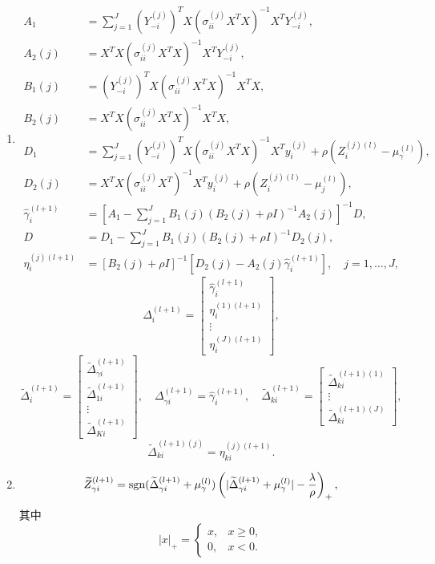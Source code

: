 \begin{enumerate}[label=步骤 \arabic*：,leftmargin=4.8em]
\[\]
执行步骤 2、3、4，直至收敛。
\item
\[
\begin{aligned}
A_1&=\sum_{j=1}^J(Y_{-i}^{(j)})^TX(\sigma_{ii}^{(j)}X^TX)^{-1}X^TY_{-i}^{(j)},\\
A_2(j)&=X^TX(\sigma_{ii}^{(j)}X^TX)^{-1}X^TY_{-i}^{(j)},\\
B_1(j)&=(Y_{-i}^{(j)})^TX(\sigma_{ii}^{(j)}X^TX)^{-1}X^TX,\\
B_2(j)&=X^TX(\sigma_{ii}^{(j)}X^TX)^{-1}X^TX,\\
D_1&=\sum_{j=1}^J(Y_{-i}^{(j)})^TX(\sigma_{ii}^{(j)}X^TX)^{-1}X^Ty_i^{(j)}
+\rho(Z_i^{(j)(l)}-\mu_\gamma^{(l)}),\\
D_2(j)&=X^TX(\sigma_{ii}^{(j)}X^T)^{-1}X^Ty_i^{(j)}
+\rho(Z_i^{(j)(l)}-\mu_j^{(l)}),\\
\widehat\gamma_i^{(l+1)}&=\left[A_1-\sum_{j=1}^JB_1(j)(B_2(j)+\rho I)^{-1}A_2(j)\right]^{-1}D,\\
D&=D_1-\sum_{j=1}^JB_1(j)(B_2(j)+\rho I)^{-1}D_2(j),\\
\eta_i^{(j)(l+1)}&=[B_2(j)+\rho I]^{-1}[D_2(j)-A_2(j)\widehat\gamma_i^{(l+1)}],\quad j=1,\ldots,J,
\end{aligned}
\]
\[
\Delta_i^{(l+1)}=\begin{bmatrix}\widehat\gamma_i^{(l+1)}\\\eta_i^{(1)(l+1)}\\\vdots\\\eta_i^{(J)(l+1)}\end{bmatrix},
\]
\[
\widetilde\Delta_i^{(l+1)}=\begin{bmatrix}\widetilde\Delta_{\gamma i}^{(l+1)}\\\widetilde\Delta_{1i}^{(l+1)}\\\vdots\\\widetilde\Delta_{Ki}^{(l+1)}\end{bmatrix},\quad
\Delta_{\gamma i}^{(l+1)}=\widehat\gamma_i^{(l+1)},\quad
\widetilde\Delta_{ki}^{(l+1)}=\begin{bmatrix}\widetilde\Delta_{ki}^{(l+1)(1)}\\\vdots\\\widetilde\Delta_{ki}^{(l+1)(J)}\end{bmatrix},
\]
\[
\widetilde\Delta_{ki}^{(l+1)(j)}=\eta_{ki}^{(j)(l+1)}.
\]
\item
\[
\widetilde Z_{\gamma i}^{(l+1)}
=\operatorname{sgn}(\widetilde\Delta_{\gamma i}^{(l+1)}+\mu_\gamma^{(l)})
\left(|\widetilde\Delta_{\gamma i}^{(l+1)}+\mu_\gamma^{(l)}|-\frac\lambda\rho\right)_+,
\]
其中
\[
|x|_+=\begin{cases}x,&x\geq0,\\0,&x<0.\end{cases}
\]
\end{enumerate}
